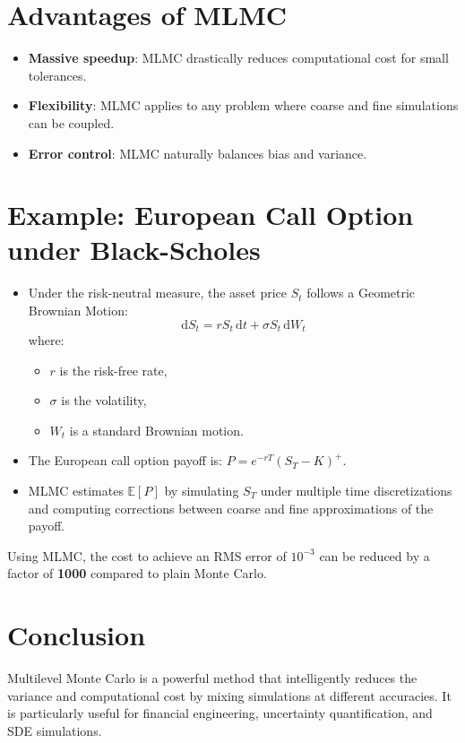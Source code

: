 \documentclass{article}
\begin{document}
\section{Advantages of MLMC}
\begin{itemize}
  \item \textbf{Massive speedup}: MLMC drastically reduces computational cost for small tolerances.
  \item \textbf{Flexibility}: MLMC applies to any problem where coarse and fine simulations can be coupled.
  \item \textbf{Error control}: MLMC naturally balances bias and variance.
\end{itemize}

\section{Example: European Call Option under Black-Scholes}
\begin{itemize}
  \item Under the risk-neutral measure, the asset price $S_t$ follows a Geometric Brownian Motion:
  \begin{equation}
  \mathrm{d}S_t = r S_t \,\mathrm{d}t + \sigma S_t \,\mathrm{d}W_t
  \end{equation}
  where:
  \begin{itemize}
    \item $r$ is the risk-free rate,
    \item $\sigma$ is the volatility,
    \item $W_t$ is a standard Brownian motion.
  \end{itemize}

  \item The European call option payoff is: $P = e^{-rT} (S_T - K)^+$.

  \item MLMC estimates $\mathbb{E}[P]$ by simulating $S_T$ under multiple time discretizations and computing corrections between coarse and fine approximations of the payoff.
\end{itemize}

Using MLMC, the cost to achieve an RMS error of $10^{-3}$ can be reduced by a factor of \textbf{1000} compared to plain Monte Carlo.

\section{Conclusion}
Multilevel Monte Carlo is a powerful method that intelligently reduces the variance and computational cost by mixing simulations at different accuracies.\newline
It is particularly useful for financial engineering, uncertainty quantification, and SDE simulations.
\end{document}
